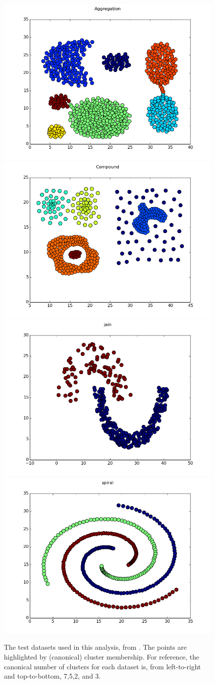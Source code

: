 \documentclass[12pt]{article}
\begin{document}
\begin{figure}[ht]
\centering
\includegraphics[width=0.47\linewidth]{../plots/datasets/Aggregation}
\includegraphics[width=0.47\linewidth]{../plots/datasets/Compound} \\
\includegraphics[width=0.47\linewidth]{../plots/datasets/jain}
\includegraphics[width=0.47\linewidth]{../plots/datasets/spiral}
\caption{The test datasets used in this analysis, from \cite{datasets}. The points are highlighted by (canonical) cluster membership. For reference, the canonical number of clusters for each dataset is, from left-to-right and top-to-bottom, 7,5,2, and 3.}
\label{fig:distributions}
\end{figure}
\end{document}
